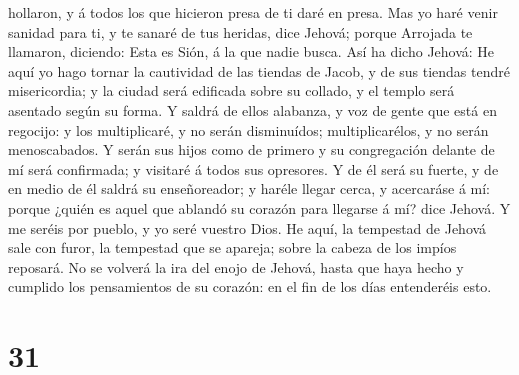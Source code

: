 hollaron, y á todos los que hicieron presa de ti daré en presa.
 Mas yo haré venir sanidad para ti, y te sanaré de tus
heridas, dice Jehová; porque Arrojada te llamaron, diciendo: Esta es
Sión, á la que nadie busca.  Así ha dicho Jehová: He aquí
yo hago tornar la cautividad de las tiendas de Jacob, y de sus tiendas
tendré misericordia; y la ciudad será edificada sobre su collado, y el
templo será asentado según su forma.  Y saldrá de ellos
alabanza, y voz de gente que está en regocijo: y los multiplicaré, y no
serán disminuídos; multiplicarélos, y no serán menoscabados.
 Y serán sus hijos como de primero y su congregación
delante de mí será confirmada; y visitaré á todos sus opresores.
 Y de él será su fuerte, y de en medio de él saldrá su
enseñoreador; y haréle llegar cerca, y acercaráse á mí: porque ¿quién es
aquel que ablandó su corazón para llegarse á mí? dice Jehová.
 Y me seréis por pueblo, y yo seré vuestro Dios.
 He aquí, la tempestad de Jehová sale con furor, la
tempestad que se apareja; sobre la cabeza de los impíos reposará.
 No se volverá la ira del enojo de Jehová, hasta que haya
hecho y cumplido los pensamientos de su corazón: en el fin de los días
entenderéis esto.

\hypertarget{section-30}{%
\section{31}\label{section-30}}

